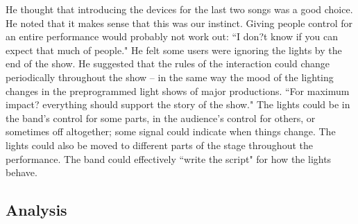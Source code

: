 He thought that introducing the devices for the last two songs was a good choice. He noted that it makes sense that this was our instinct. Giving people control for an entire performance would probably not work out: ``I don?t know if you can expect that much of people." He felt some users were ignoring the lights by the end of the show. He suggested that the rules of the interaction could change periodically throughout the show -- in the same way the mood of the lighting changes in the preprogrammed light shows of major productions. ``For maximum impact? everything should support the story of the show." The lights could be in the band's control for some parts, in the audience's control for others, or sometimes off altogether; some signal could indicate when things change. The lights could also be moved to different parts of the stage throughout the performance. The band could effectively ``write the script" for how the lights behave.

\subsection{Analysis}





